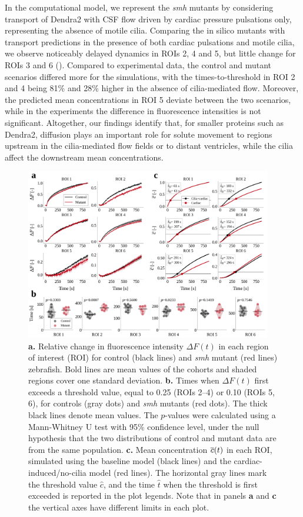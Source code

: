 \documentclass{WileyMSP-template}
\begin{document}
In the computational model, we represent the \emph{smh} mutants by
considering transport of Dendra2 with CSF flow driven by cardiac
pressure pulsations only, representing the absence of motile
cilia. Comparing the in silico mutants with transport predictions in
the presence of both cardiac pulsations and motile cilia, we observe
noticeably delayed dynamics in ROIs 2, 4 and 5, but little change for
ROIs 3 and 6 (). Compared to experimental
data, the control and mutant scenarios differed more for the
simulations, with the times-to-threshold in ROI 2 and 4 being 81\% and
28\% higher in the absence of cilia-mediated flow. Moreover, the
predicted mean concentrations in ROI 5 deviate between the two
scenarios, while in the experiments the difference in
fluorescence intensities is not significant.
Altogether, our findings identify that,
for smaller proteins such as Dendra2,
diffusion plays an important role for solute movement to regions
upstream in the cilia-mediated flow fields or to distant ventricles,
while the cilia affect the downstream mean concentrations.
\begin{figure}[H]
    \centering
    \includegraphics[width=0.96\textwidth]{graphics/figure4_compare_control_mutant.png}
    \caption{\textbf{a.} Relative change in fluorescence intensity $\Delta F(t)$
    in each region of interest (ROI) for control (black lines)
    and \emph{smh} mutant (red lines) zebrafish. 
    Bold lines are mean values of the cohorts and shaded regions cover one standard deviation.
    \textbf{b.} Times when $\Delta F(t)$ first exceeds a threshold value,
    equal to 0.25 (ROIs 2--4) or 0.10 (ROIs 5, 6), for controls (gray dots) and
    \emph{smh} mutants (red dots).
    The thick black lines denote mean values. The $p$-values
    were calculated using a Mann-Whitney U test with 95\% confidence level,
    under the null hypothesis that the two distributions of control and mutant data are 
    from the same population.
    \textbf{c.} Mean concentration $\overline{c}(t)$ in each ROI,
    simulated using the baseline model (black lines) and the cardiac-induced/no-cilia model (red lines).
    The horizontal gray lines mark the threshold value $\hat{c}$, and the time
    $\hat{t}$ when the threshold is first exceeded is reported in the plot legends.
    Note that in panels \textbf{a} and \textbf{c} the vertical axes have
    different limits in each plot.}
    \label{fig:fig4}
\end{figure}
\end{document}
